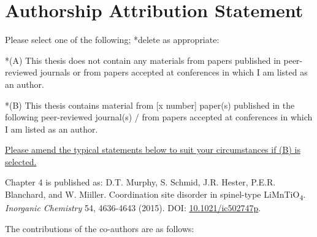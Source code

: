 \section*{Authorship Attribution Statement}

Please select one of the following; *delete as appropriate:

\vspace{0.5\baselineskip}

*(A) This thesis does not contain any materials from papers published in peer-reviewed journals or from papers accepted at conferences in which I am listed as an author.

\vspace{0.5\baselineskip}

*(B) This thesis contains material from [x number] paper(s) published in the following peer-reviewed journal(s) / from papers accepted at conferences in which I am listed as an author.

\vspace{0.5\baselineskip}

\textcolor{DeepGreen}{\uline{%
Please amend the typical statements below to suit your circumstances if (B) is selected.}}

\vspace{0.5\baselineskip}

Chapter 4 is published as: 
\textcolor{DeepGreen}{
D.T. Murphy, S. Schmid, J.R. Hester, P.E.R. Blanchard, and W. Miiller. Coordination site disorder in spinel-type LiMnTiO\textsubscript{4}. \textit{Inorganic Chemistry} 54, 4636-4643 (2015). DOI: \href{https://doi.org/10.1021/ic502747p}{10.1021/ic502747p}.
}

\vspace{0.5\baselineskip}

The contributions of the co-authors are as follows:

